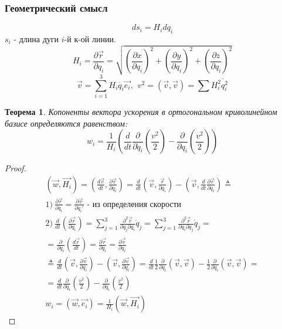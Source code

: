 \documentclass{article}
\newtheorem{teo}{Теорема}
\begin{document}
  \subsubsection{Геометрический смысл}
  $$ ds_i = H_i dq_i $$
  $s_i$ - длина дуги $i$-й к-ой линии.
  $$ H_i = \frac{\partial \vec{r}}{\partial q_i}  = \sqrt{\left(\frac{\partial x}{\partial q_i}\right) ^2 + \left(\frac{\partial y}{\partial q_i}\right) ^2 + \left(\frac{\partial z}{\partial q_i}\right) ^2} $$
  $$ \vec{v} = \sum\limits_{i=1}^3 H_i \dot{q_i} \vec{e_i},~~ v^2 = (\vec{v}, \vec{v}) = \sum H_i^2\dot{q_i^2} $$ 
  \begin{teo}
  Копоненты вектора ускорения в ортогональном криволинейном базисе определяются равенством:
  $$ w_i = \frac{1}{H_i}\left(\frac{d}{dt} \frac{\partial}{\partial \dot q_i} \left(\frac{v^2}{2}\right) - \frac{\partial}{\partial q_i} \left(\frac{v^2}{2} \right) \right) $$
  \end{teo}
  \begin{proof}
  \begin{gather}
(\vec{w}, \vec{H_i}) = \left(\frac{d\vec{v}}{dt}, \frac{\partial \vec{r}}{\partial q_i} \right) = \frac{d}{dt} \left(\vec{v}, \frac{\vec{r}}{\partial q_i}\right) - \left(\vec{v}, \frac{d}{dt} \frac{\partial \vec{r}}{\partial q_i} \right) \triangleq \\
1) ~ \frac{\partial \vec{r}}{\partial q_i} = \frac{\partial \vec{v}}{\partial q_i'} \text{ - из определения скорости} \\
2) ~ \frac{d}{dt} \left(\frac{\partial \vec{r}}{\partial q_i} \right) = \sum \limits_{j = 1}^3 \frac{\partial^2 \vec{r}}{\partial q_j \partial q_i} \dot q_j = \sum \limits_{j = 1}^3 \frac{\partial^2 \vec{r}}{\partial q_i \partial q_j} \dot q_j = \\ 
= \frac{\partial}{\partial q_i} \left( \frac{d\vec{r}}{dt} \right) = \frac{\partial \dot{\vec r}}{\partial q_i} = \frac{\partial \vec{v}}{\partial q_i} \\
\triangleq \frac{d}{dt} \left(\vec{v}, \frac{\partial \vec{v}}{\partial q_i} \right) - \left( \vec{v}, \frac{\partial \vec{v}}{\partial q_i} \right) = \frac{d}{dt} \frac{1}{2} \frac{\partial}{\partial q_i} (\vec{v}, \vec{v}) - \frac{1}{2} \frac{\partial}{\partial q_i} (\vec{v}, \vec{v}) = \\ 
= \frac{d}{dt} \frac{\partial}{\partial \dot q_i} \left(\frac{v^2}{2} \right) - \frac{\partial}{\partial q_i} \left(\frac{v^2}{2}\right) \\
w_i = (\vec{w}, \vec{e_i}) = \frac{1}{H_i}(\vec{w}, \vec{H_i})
  \end{gather}
  \end{proof}
  
\end{document}
